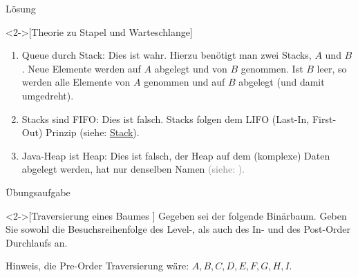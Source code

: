 \begin{frame}[c]{Lösung}
    \begin{solve}<2->[Theorie zu Stapel und Warteschlange]
        \pause{}\begin{enumerate}[<+(1)->]
            \item Queue durch Stack:\pause{} Dies ist wahr. Hierzu benötigt man zwei Stacks, \(A\) und \(B\).\pause{} Neue Elemente werden auf \(A\) abgelegt und von \(B\) genommen.\pause{} Ist \(B\) leer, so werden alle Elemente von \(A\) genommen und auf \(B\) abgelegt (und damit umgedreht).
            \item Stacks sind FIFO:\pause{} Dies ist falsch.\pause{} Stacks folgen dem LIFO (Last-In, First-Out) Prinzip (siehe: \hyperlink{mrk:Stack}{Stack}).
            \item Java-Heap ist Heap:\pause{} Dies ist falsch, der Heap auf dem (komplexe) Daten abgelegt werden,\pause{} hat nur denselben Namen \textcolor{gray}{(siehe: ).}
        \end{enumerate}
    \end{solve}
\end{frame}

\begin{frame}[c]{Übungsaufgabe}
    \begin{exercise}<2->[Traversierung eines Baumes ]
        \pause{}Gegeben sei der folgende Binärbaum. Geben Sie sowohl die Besuchsreihenfolge des Level-, als auch des In- und des Post-Order Durchlaufs an.\pause{}
        \begin{center}
        \end{center}
        \pause{}Hinweis, die Pre-Order Traversierung wäre: \(A,B,C,D,E,F,G,H,I\).
    \end{exercise}
\end{frame}

